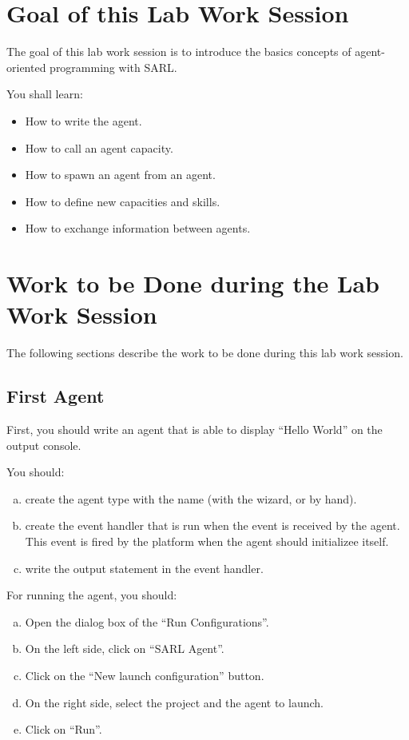 \documentclass[article,english,nodocumentinfo]{utbmciadreport}
\begin{document}
\section{Goal of this Lab Work Session}

The goal of this lab work session is to introduce the basics concepts of agent-oriented programming with SARL.

You shall learn: 
\begin{itemize}
\item How to write the agent.
\item How to call an agent capacity.
\item How to spawn an agent from an agent.
\item How to define new capacities and skills.
\item How to exchange information between agents.
\end{itemize}



\section{Work to be Done during the Lab Work Session}

The following sections describe the work to be done during this lab work session.

\subsection{First Agent}

First, you should write an agent that is able to display ``Hello World'' on the output console.

You should:
\begin{enumerate}[a)]
\item create the agent type with the name  (with the wizard, or by hand).
\item create the event handler that is run when the  event is received by the agent. This event is fired by the platform when the agent should initializee itself.
\item write the output statement in the event handler.
\end{enumerate}

For running the agent, you should:
\begin{enumerate}[a)]
\item Open the dialog box of the ``Run Configurations''.
\item On the left side, click on ``SARL Agent''.
\item Click on the ``New launch configuration'' button.
\item On the right side, select the project and the agent to launch.
\item Click on ``Run''.
\end{enumerate}
\end{document}
